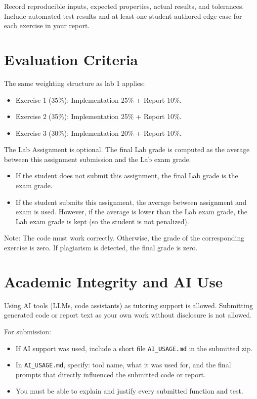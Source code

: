 \documentclass[11pt,a4paper]{article}
\begin{document}
Record reproducible inputs, expected properties, actual results, and tolerances.
Include automated test results and at least one student-authored edge case for
each exercise in your report.

\section*{Evaluation Criteria}

The same weighting structure as lab 1 applies:
\begin{itemize}[leftmargin=*]
    \item Exercise 1 (35\%): Implementation 25\% + Report 10\%.
    \item Exercise 2 (35\%): Implementation 25\% + Report 10\%.
    \item Exercise 3 (30\%): Implementation 20\% + Report 10\%.
\end{itemize}

The Lab Assignment is optional. The final Lab grade is computed as the average between this
assignment submission and the Lab exam grade.
\begin{itemize}[leftmargin=*]
    \item If the student does not submit this assignment, the final Lab grade is the exam grade.
    \item If the student submits this assignment, the average between assignment and exam is used.
    However, if the average is lower than the Lab exam grade, the Lab exam grade is kept
    (so the student is not penalized).
\end{itemize}

Note: The code must work correctly. Otherwise, the grade of the corresponding
exercise is zero. If plagiarism is detected, the final grade is zero.

\section*{Academic Integrity and AI Use}
Using AI tools (LLMs, code assistants) as tutoring support is allowed.
Submitting generated code or report text as your own work without disclosure is
not allowed.

For submission:
\begin{itemize}[leftmargin=*]
    \item If AI support was used, include a short file \texttt{AI\_USAGE.md}
    in the submitted zip.
    \item In \texttt{AI\_USAGE.md}, specify: tool name, what it was used for,
    and the final prompts that directly influenced the submitted code or report.
    \item You must be able to explain and justify every submitted function and
    test.
\end{itemize}
\end{document}

